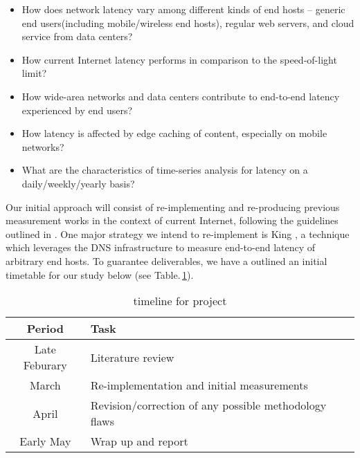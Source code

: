 \begin{itemize}
\item How does network latency vary among different kinds of end hosts -- generic end users(including mobile/wireless end hosts), regular web servers, and cloud service from data centers?
\item How current Internet latency performs in comparison to the speed-of-light limit?
\item How wide-area networks and data centers contribute to end-to-end latency experienced by end users?
\item How latency is affected by edge caching of content, especially on mobile networks?
\item What are the characteristics of time-series analysis for latency on a daily/weekly/yearly basis?
\end{itemize}

Our initial approach will consist of re-implementing and re-producing previous measurement works in the context of current Internet, following the guidelines outlined in \cite{paxson2004strategies}. One major strategy we intend to re-implement is King \cite{gummadi2002king}, a technique which leverages the DNS infrastructure to measure end-to-end latency of arbitrary end hosts. To guarantee deliverables, we have a outlined an initial timetable for our study below (see Table.\,\ref{tab:plan}).

\begin{table}
  \centering
  \begin{tabular}{ c|p{4cm} }
    \hline
    Period & Task \\
    \hline
    Late Feburary & Literature review \\
    March & Re-implementation and initial measurements \\
    April & Revision/correction of any possible methodology flaws \\
    Early May & Wrap up and report \\ 
    \hline
  \end{tabular}
  \label{tab:plan}
  \caption{timeline for project}
\end{table}

